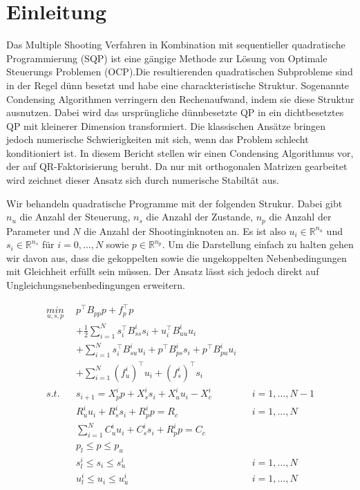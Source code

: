 \section{Einleitung}
Das Multiple Shooting Verfahren in Kombination mit sequentieller quadratische Programmierung (SQP) ist eine gängige Methode zur Lösung von Optimale Steuerungs Problemen (OCP).Die resultierenden quadratischen Subprobleme sind in der Regel dünn besetzt und habe eine charackteristische Struktur. Sogenannte Condensing Algorithmen verringern den Rechenaufwand, indem sie diese Struktur ausnutzen. Dabei wird das ursprüngliche dünnbesetzte QP in ein dichtbesetztes QP mit kleinerer Dimension transformiert. Die klassischen Ansätze bringen jedoch numerische Schwierigkeiten mit sich, wenn das Problem schlecht konditioniert ist. In diesem Bericht stellen wir einen Condensing Algorithmus vor, der auf QR-Faktorisierung beruht. Da nur mit orthogonalen Matrizen gearbeitet wird zeichnet dieser Ansatz sich durch numerische Stabiltät aus.

Wir behandeln quadratische Programme mit der folgenden Strukur. Dabei gibt $n_u$ die Anzahl der Steuerung, $n_s$ die Anzahl der Zustande, $n_p$ die Anzahl der Parameter und $N$ die Anzahl der Shootinginknoten an. Es ist also $u_i \in \mathbb{R}^{n_u}$ und $s_i \in \mathbb{R}^{n_s}$ für $i=0, \hdots, N$ sowie $p \in \mathbb{R}^{n_p}$. Um die Darstellung einfach zu halten gehen wir davon aus, dass die gekoppelten sowie die ungekoppelten Nebenbedingungen mit Gleichheit erfüllt sein müssen. Der Ansatz lässt sich jedoch direkt auf Ungleichungsnebenbedingungen erweitern.

\begin{align*}
\underset{u,s,p}{min}\ \	&p^\top B_{pp} p+f_p^\top p  \\ 
						&+\frac{1}{2}\sum_{i=1}^{N} s_i^\top B_{ss}^i s_i+u_i^\top B_{uu}^i u_i \\
						&+\sum_{i=1}^{N} s_i^\top B^i_{su} u_i+p^\top B_{ps}^i s_i +p^\top B_{pu}^i u_i  \\
						&+\sum_{i=1}^{N} (f_u^i)^\top u_i+(f_s^i)^\top s_i \\
s.t. 	\ \				&s_{i+1}=X_p^i p +X_s^i s_i + X_u^i u_i -X_c^i  		&& i=1,\hdots,N-1\\
						& R_u^i u_i + R_s^i s_i+R_p^i p =R_c   		&& i=1,\hdots,N \\
						& \sum_{i=1}^{N} C_u^i u_i + C_s^i s_i + R_p^i p = C_c \\
						& p_l \leq p \leq p_u \\
						& s_l^i \leq s_i \leq s_u^i && i=1,\hdots,N \\ 
						& u_l^i \leq u_i  \leq u_u^i  && i=1,\hdots,N
\end{align*}


